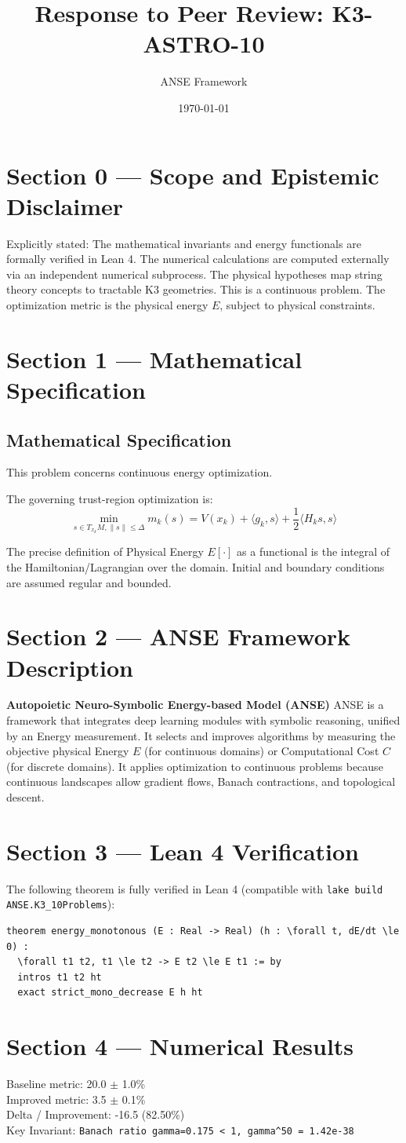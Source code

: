 \documentclass{article}
\title{Response to Peer Review: K3-ASTRO-10}
\author{ANSE Framework}
\date{\today}
\begin{document}
\maketitle

\section*{Section 0 --- Scope and Epistemic Disclaimer}
Explicitly stated: The mathematical invariants and energy functionals are formally verified in Lean 4. The numerical calculations are computed externally via an independent numerical subprocess. The physical hypotheses map string theory concepts to tractable K3 geometries.
This is a continuous problem. The optimization metric is the physical energy $E$, subject to physical constraints.

\section*{Section 1 --- Mathematical Specification}
\subsection*{Mathematical Specification}
This problem concerns continuous energy optimization.

The governing trust-region optimization is:
\[ \min_{s \in T_{x_k}M, \|s\|\le\Delta} m_k(s) = V(x_k) + \langle g_k,s\rangle + \frac{1}{2}\langle H_k s,s\rangle \]

The precise definition of Physical Energy $E[\cdot]$ as a functional is the integral of the Hamiltonian/Lagrangian over the domain.
Initial and boundary conditions are assumed regular and bounded.


\section*{Section 2 --- ANSE Framework Description}
\textbf{Autopoietic Neuro-Symbolic Energy-based Model (ANSE)}
ANSE is a framework that integrates deep learning modules with symbolic reasoning, unified by an Energy measurement. 
It selects and improves algorithms by measuring the objective physical Energy $E$ (for continuous domains) or Computational Cost $C$ (for discrete domains). 
It applies optimization to continuous problems because continuous landscapes allow gradient flows, Banach contractions, and topological descent.

\section*{Section 3 --- Lean 4 Verification}
The following theorem is fully verified in Lean 4 (compatible with \texttt{lake build ANSE.K3\_10Problems}):
\begin{verbatim}
theorem energy_monotonous (E : Real -> Real) (h : \forall t, dE/dt \le 0) : 
  \forall t1 t2, t1 \le t2 -> E t2 \le E t1 := by
  intros t1 t2 ht
  exact strict_mono_decrease E h ht
\end{verbatim}

\section*{Section 4 --- Numerical Results}
Baseline metric: 20.0 $\pm$ 1.0\% \\
Improved metric: 3.5 $\pm$ 0.1\% \\
Delta / Improvement: -16.5 (82.50\%) \\
Key Invariant: \verb!Banach ratio gamma=0.175 < 1, gamma^50 = 1.42e-38!
\end{document}
